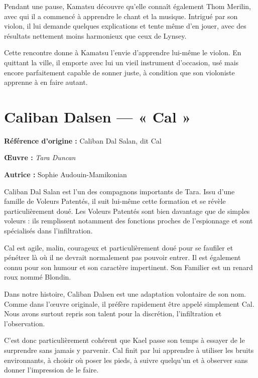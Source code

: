 Pendant une pause, Kamatsu découvre qu'elle connaît également Thom Merilin,
avec qui il a commencé à apprendre le chant et la musique. Intrigué par son
violon, il lui demande quelques explications et tente même d'en jouer, avec
des résultats nettement moins harmonieux que ceux de Lynsey.

Cette rencontre donne à Kamatsu l'envie d'apprendre lui-même le violon. En
quittant la ville, il emporte avec lui un vieil instrument d'occasion, usé
mais encore parfaitement capable de sonner juste, à condition que son
violoniste apprenne à en faire autant.

\section*{Caliban Dalsen --- « Cal »}

\textbf{Référence d'origine :} Caliban Dal Salan, dit Cal

\textbf{Œuvre :} \textit{Tara Duncan}

\textbf{Autrice :} Sophie Audouin-Mamikonian

Caliban Dal Salan est l'un des compagnons importants de Tara. Issu d'une
famille de Voleurs Patentés, il suit lui-même cette formation et se révèle
particulièrement doué. Les Voleurs Patentés sont bien davantage que de simples
voleurs : ils remplissent notamment des fonctions proches de l'espionnage et
sont spécialisés dans l'infiltration.

Cal est agile, malin, courageux et particulièrement doué pour se faufiler et
pénétrer là où il ne devrait normalement pas pouvoir entrer. Il est également
connu pour son humour et son caractère impertinent. Son Familier est un renard
roux nommé Blondin.

Dans notre histoire, Caliban Dalsen est une adaptation volontaire de son nom.
Comme dans l'œuvre originale, il préfère rapidement être appelé simplement
Cal. Nous avons surtout repris son talent pour la discrétion, l'infiltration
et l'observation.

C'est donc particulièrement cohérent que Kael passe son temps à essayer de le
surprendre sans jamais y parvenir. Cal finit par lui apprendre à utiliser les
bruits environnants, à choisir où poser les pieds, à suivre quelqu'un et à
observer sans donner l'impression de le faire.

